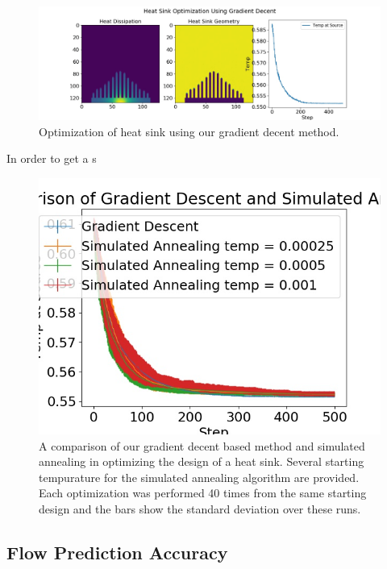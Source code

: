 \documentclass{article} %
\begin{document}
\begin{figure}[!t]
\begin{center}
\includegraphics[scale=0.30]{../test/figs/heat_learn_gradient_decent.jpeg}
\end{center}
\caption{Optimization of heat sink using our gradient decent method.}
\label{heat_sink_optimization}
\end{figure}

In order to get a s

\begin{figure}[h]
\begin{center}
\includegraphics[scale=0.30]{../test/figs/heat_learn_comparison.jpeg}
\end{center}
\caption{A comparison of our gradient decent based method and simulated annealing in optimizing the design of a heat sink. Several starting tempurature for the simulated annealing algorithm are provided. Each optimization was performed 40 times from the same starting design and the bars show the standard deviation over these runs.}
\end{figure}


\subsection{Flow Prediction Accuracy}
\end{document}
